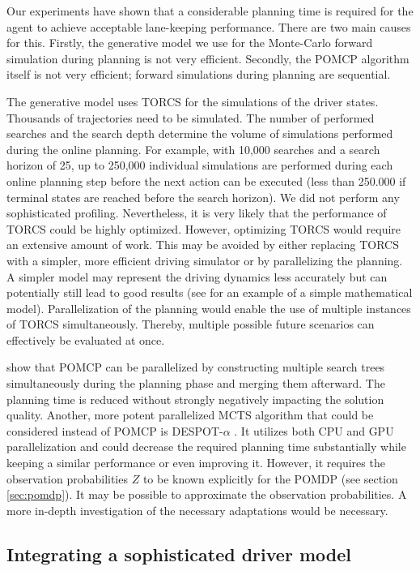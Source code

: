 Our experiments have shown that a considerable planning time is required for the agent to achieve acceptable lane-keeping performance. There are two main causes for this. Firstly, the generative model we use for the Monte-Carlo forward simulation during planning is not very efficient. Secondly, the POMCP algorithm itself is not very efficient; forward simulations during planning are sequential.

The generative model uses TORCS for the simulations of the driver states. Thousands of trajectories need to be simulated. The number of performed searches and the search depth determine the volume of simulations performed during the online planning. For example, with 10,000 searches and a search horizon of 25, up to 250,000 individual simulations are performed during each online planning step before the next action can be executed (less than 250.000 if terminal states are reached before the search horizon). We did not perform any sophisticated profiling. Nevertheless, it is very likely that the performance of TORCS could be highly optimized. However, optimizing TORCS would require an extensive amount of work. This may be avoided by either replacing TORCS with a simpler, more efficient driving simulator or by parallelizing the planning. A simpler model may represent the driving dynamics less accurately but can potentially still lead to good results (see \cite{hitl_pomdp} for an example of a simple mathematical model). Parallelization of the planning would enable the use of multiple instances of TORCS simultaneously. Thereby, multiple possible future scenarios can effectively be evaluated at once.

\cite{pomcp-parallel} show that POMCP can be parallelized by constructing multiple search trees simultaneously during the planning phase and merging them afterward. The planning time is reduced without strongly negatively impacting the solution quality. Another, more potent parallelized MCTS algorithm that could be considered instead of POMCP is DESPOT-$\alpha$ \parencite{despot-a}. It utilizes both CPU and GPU parallelization and could decrease the required planning time substantially while keeping a similar performance or even improving it. However, it requires the observation probabilities $Z$ to be known explicitly for the POMDP (see section \ref{sec:pomdp}). It may be possible to approximate the observation probabilities. A more in-depth investigation of the necessary adaptations would be necessary.

\subsection{Integrating a sophisticated driver model}
\label{sec:complex-driver}

